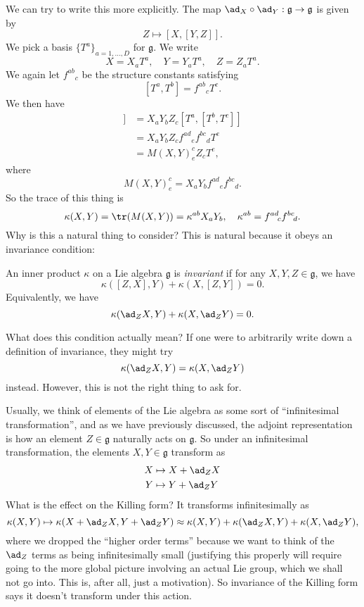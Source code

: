 \documentclass[a4paper]{article}
\begin{document}
We can try to write this more explicitly. The map $\ad_X \circ \ad_Y: \mathfrak{g} \to \mathfrak{g}$ is given by
\[
  Z \mapsto [X, [Y, Z]].
\]
We pick a basis $\{T^a\}_{a = 1, \ldots, D}$ for $\mathfrak{g}$. We write
\[
  X = X_aT^a,\quad Y = Y_aT^a,\quad Z = Z_aT^a.
\]
We again let $f^{ab}\!_c$ be the structure constants satisfying
\[
  [T^a, T^b] = f^{ab}\!_c T^c.
\]
We then have
\begin{align*}
  [X, [Y, Z]] &= X_a Y_b Z_ c [T^a, [T^b, T^c]]\\
  &= X_a Y_b Z_c f^{ad}\!_e f^{bc}\!_d T^e\\
  &= M(X, Y)^c_e Z_c T^e,
\end{align*}
where
\[
  M(X, Y)^c_e = X_a Y_b f^{ad}\!_e f^{bc}\!_d.
\]
So the trace of this thing is
\[
  \kappa(X, Y) = \tr(M(X, Y)) = \kappa^{ab}X_a Y_b,\quad \kappa^{ab} = f^{ad}\!_c f^{bc}\!_d.
\]
Why is this a natural thing to consider? This is natural because it obeys an invariance condition:
\begin{defi}
  An inner product $\kappa$ on a Lie algebra $\mathfrak{g}$ is \emph{invariant} if for any $X, Y, Z \in \mathfrak{g}$, we have
  \[
    \kappa([Z, X], Y)+ \kappa(X, [Z, Y]) = 0.
  \]
  Equivalently, we have
  \[
    \kappa(\ad_Z X, Y) + \kappa(X, \ad_Z Y) = 0.
  \]
\end{defi}
What does this condition actually mean? If one were to arbitrarily write down a definition of invariance, they might try
\[
  \kappa(\ad_Z X, Y) = \kappa(X, \ad_Z Y)
\]
instead. However, this is not the right thing to ask for.

Usually, we think of elements of the Lie algebra as some sort of ``infinitesimal transformation'', and as we have previously discussed, the adjoint representation is how an element $Z \in \mathfrak{g}$ naturally acts on $\mathfrak{g}$. So under an infinitesimal transformation, the elements $X, Y \in \mathfrak{g}$ transform as
\begin{align*}
  X &\mapsto X + \ad_Z X\\
  Y &\mapsto Y + \ad_Z Y
\end{align*}
What is the effect on the Killing form? It transforms infinitesimally as
\[
  \kappa(X, Y) \mapsto \kappa(X + \ad_Z X, Y + \ad_Z Y) \approx \kappa(X, Y) + \kappa(\ad_Z X, Y)+ \kappa(X, \ad_Z Y),
\]
where we dropped the ``higher order terms'' because we want to think of the $\ad_Z$ terms as being infinitesimally small (justifying this properly will require going to the more global picture involving an actual Lie group, which we shall not go into. This is, after all, just a motivation). So invariance of the Killing form says it doesn't transform under this action.
\end{document}
